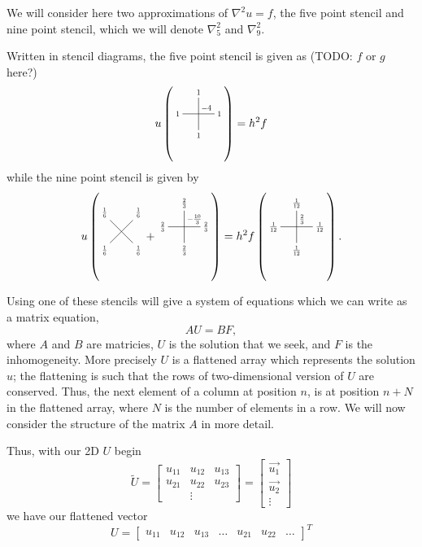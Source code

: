 We will consider here two approximations of $\nabla^2 u = f$, the five point stencil and nine point stencil, which we will denote $\nabla_5^2$ and $\nabla_9^2$.

\newcommand{\crossStencil}[5]{%
  \begin{tikzpicture}[scale=0.5,baseline=1mm, every node/.style={scale=0.7}]
    \draw node[below]{$#1$} (0,0) -- (0,2) node[above]{$#2$};
    \draw (-1, 1) node[left]{$#3$} -- (1, 1) node[right]{$#4$};
    \node[above right] at (0,1) {$#5$};
  \end{tikzpicture}
}

\newcommand{\xStencil}[4]{%
  \begin{tikzpicture}[scale=0.5,baseline=1mm, every node/.style={scale=0.7}]
    \draw node[below left]{$#1$} (0,0) -- (1.41, 1.41) node[above right]{$#2$};
    \draw (0, 1.41) node[above left]{$#3$} -- (1.41, 0) node[below right]{$#4$};
  \end{tikzpicture}
}

Written in stencil diagrams, the five point stencil is given as (TODO: $f$ or $g$ here?)
$$
u \left(\crossStencil{1}{1}{1}{1}{-4}\right) = h^2 f
$$
while the nine point stencil is given by
$$
u
\left(
\xStencil{\frac16}{\frac16}{\frac16}{\frac16}
+
\crossStencil{\frac23}{\frac23}{\frac23}{\frac23}{-\frac{10}{3}}
\right)
=
h^2
f
\left(
\crossStencil{\frac1{12}}{\frac1{12}}{\frac1{12}}{\frac1{12}}{\frac23}
\right).
$$

Using one of these stencils will give a system of equations which we can write as a matrix equation,
$$
AU = BF,
$$
where $A$ and $B$ are matricies, $U$ is the solution that we seek, and $F$ is the inhomogeneity.
More precisely $U$ is a flattened array which represents the solution $u$;
the flattening is such that the rows of two-dimensional version of $U$ are conserved.
Thus, the next element of a column at position $n$, is at position $n+N$ in the flattened array, where $N$ is the number of elements in a row.
We will now consider the structure of the matrix $A$ in more detail.

Thus, with our 2D $U$ begin 
$$
\tilde{U} =
\begin{bmatrix}
  u_{11} & u_{12} & u_{13}\\
  u_{21} & u_{22} & u_{23}\\
  & \vdots
\end{bmatrix}
=
\begin{bmatrix}
  \vec{u_1}\\
  \vec{u_2}\\
  \vdots
\end{bmatrix}
$$
we have our flattened vector
$$
U =
\begin{bmatrix}
  u_{11} & u_{12} & u_{13} & \dots & u_{21} & u_{22} & \dots
\end{bmatrix}^T
$$

